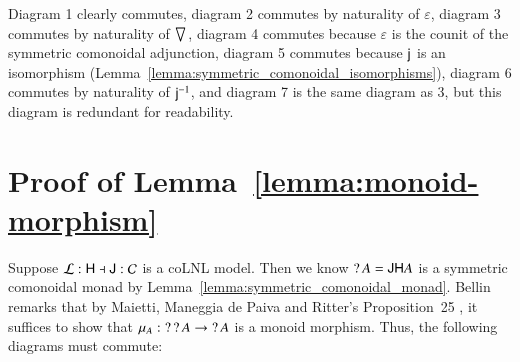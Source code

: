 Diagram 1 clearly commutes, diagram 2 commutes by naturality of
$\varepsilon$, diagram 3 commutes by naturality of $\bigtriangledown_{}$,
diagram 4 commutes because $\varepsilon$ is the counit of the
symmetric comonoidal adjunction, diagram 5 commutes because $\mathsf{j}_{}$
is an isomorphism
(Lemma~\ref{lemma:symmetric_comonoidal_isomorphisms}), diagram 6
commutes by naturality of $\mathsf{j}^{-1}_{}$, and diagram 7 is the same
diagram as 3, but this diagram is redundant for readability.

\section{Proof of Lemma~\ref{lemma:monoid-morphism}}
\label{sec:proof_of_lemma:monoid-morphism}
Suppose $\mathcal{L} : \mathsf{H} \dashv \mathsf{J} : \mathcal{C}$ is a coLNL
model.  Then we know $\mathop{?} A = \mathsf{J}\mathsf{H} A$ is a symmetric comonoidal
monad by Lemma~\ref{lemma:symmetric_comonoidal_monad}.  Bellin
\cite{Bellin:2012} remarks that by Maietti, Maneggia de Paiva and
Ritter's Proposition~25 \cite{Maietti2005}, it suffices to show that
$\mu_A : \mathop{?}\mathop{?} A \rightarrow \mathop{?} A$ is a monoid morphism.  Thus, the
following diagrams must commute:
